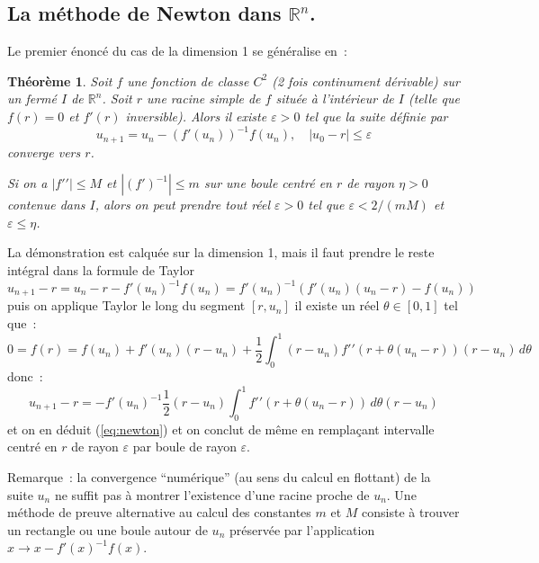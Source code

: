 \documentclass[a4paper,11pt]{article}
\newtheorem{thm}{Théorème}
\newcommand{\R}{{\mathbb{R}}}
\begin{document}
\subsection{La m\'ethode de Newton dans $\R^n$.}
Le premier \'enonc\'e du cas de la dimension 1 se g\'en\'eralise en~:
\begin{thm} 
Soit $f$ une fonction de classe $C^2$ (2 fois continument dérivable)
sur un ferm\'e $I$ de $\R^n$. Soit $r$ une racine simple de $f$
situ\'ee \`a l'int\'erieur de $I$
(telle que $f(r)=0$ et $f'(r)$ inversible). Alors il existe $\varepsilon>0$
tel que la suite définie par
\[ u_{n+1} = u_n -(f'(u_n) )^{-1}f(u_n), \quad |u_0-r| \leq \varepsilon \]
converge vers $r$.

Si on a $|f'{'}| \leq M$ et $|(f')^{-1}| \leq m$ sur une boule
centr\'e en $r$ de rayon $\eta>0$ contenue dans $I$, alors on peut prendre tout r\'eel
$\varepsilon>0$ tel que $\varepsilon < 2/(mM)$ et $\varepsilon \leq \eta$.
\end{thm}
La d\'emonstration est calqu\'ee sur la dimension 1, mais il faut
prendre le reste int\'egral dans la formule de Taylor
\[ u_{n+1}-r = u_n - r - f'(u_n)^{-1} f(u_n) = 
f'(u_n)^{-1} (f'(u_n)(u_n-r)-f(u_n) ) \]
puis on applique Taylor le long du segment $[r,u_n]$
il existe un réel $\theta \in [0,1]$ tel que~:
\[ 0 = f(r)=f(u_n)+ f'(u_n) (r-u_n)+ \frac{1}{2} \int_0^1 (r-u_n)
f'{'}(r+\theta (u_n-r)) (r-u_n) \, d\theta \]
donc~:
$$u_{n+1}-r =-f'(u_n)^{-1} \frac{1}{2} (r-u_n) \int_0^1 f'{'}(r+\theta
(u_n-r)) \, d\theta (r-u_n)  $$
et on en d\'eduit (\ref{eq:newton}) et on conclut de m\^eme en
rempla\c{c}ant intervalle centr\'e en $r$ de rayon $\varepsilon$
par boule de rayon $\varepsilon$.

Remarque~: la convergence ``num\'erique'' (au sens du calcul en
flottant) de la suite $u_n$ ne suffit pas \`a montrer l'existence
d'une racine proche de $u_n$. Une m\'ethode de preuve alternative
au calcul des constantes $m$ et $M$ consiste
\`a trouver un rectangle ou une boule autour de $u_n$ pr\'eserv\'ee
par l'application $x\rightarrow x-f'(x)^{-1} f(x)$.


\end{document}

